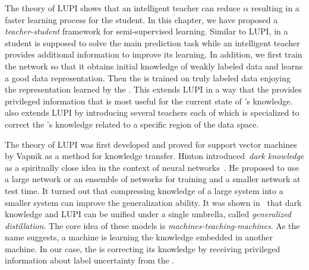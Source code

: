 The theory of LUPI shows that an intelligent teacher can reduce $\alpha$ resulting in a faster learning process for the student. In this chapter, we have proposed a \emph{teacher}-\emph{student} framework for semi-supervised learning. Similar to LUPI, in \fwl a student is supposed to solve the main prediction task while an intelligent teacher provides additional information to improve its learning. In addition, we first train the \std network so that it obtains initial knowledge of weakly labeled data and learns a good data representation. Then the \tch is trained on truly labeled data enjoying the representation learned by the \std. This extends LUPI in a way that the \tch provides privileged information that is most useful for the current state of \std's knowledge. \fwl also extends LUPI by introducing several teachers each of which is specialized to correct the \std's knowledge related to a specific region of the data space.


The theory of LUPI was first developed and proved for support vector machines by Vapnik as a method for knowledge transfer. Hinton introduced~\emph{dark knowledge} as a spiritually close idea in the context of neural networks~\citep{Hinton:2006}. He proposed to use a large network or an ensemble of networks for training and a smaller network at test time. It turned out that compressing knowledge of a large system into a smaller system can improve the generalization ability. It was shown 
in~\citep{lopez:2015} that dark knowledge and LUPI can be unified under a single umbrella, called \emph{generalized distillation}. The core idea of these models is \emph{machines-teaching-machines}. As the name suggests, a machine is learning the knowledge embedded in another machine. In our case, the \std is correcting its knowledge by receiving privileged information about label uncertainty from the \tch. 

